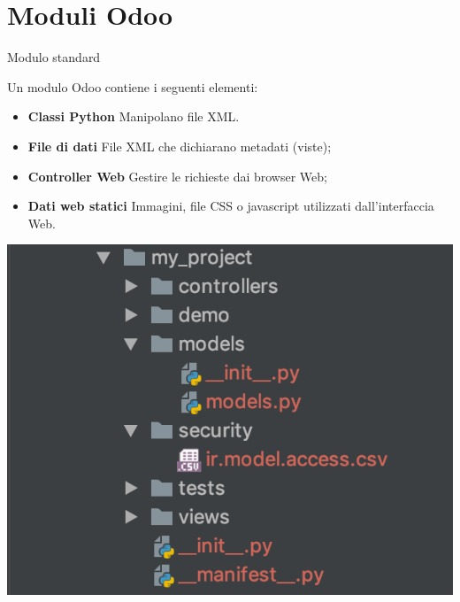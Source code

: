 \documentclass{beamer}
\begin{document}
\section{Moduli Odoo}
\begin{frame}{Modulo standard}
\begin{minipage}[c]{1\textwidth}
Un modulo Odoo contiene i seguenti elementi:

\begin{itemize}
	\item \textbf{Classi Python} Manipolano file XML.
	\item \textbf{File di dati} File XML che dichiarano metadati (viste);
	\item \textbf{Controller Web} Gestire le richieste dai browser Web;
	\item \textbf{Dati web statici} Immagini, file CSS o javascript utilizzati dall'interfaccia Web.
\end{itemize}
\end{minipage}

\hfill
\begin{minipage}[c]{0.45\textwidth}
	\includegraphics[width=0.7\linewidth]{figures/structure_odoo}
\end{minipage}

\end{frame}
\end{document}
